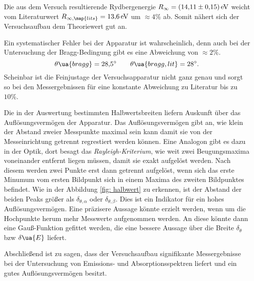 Die aus dem Versuch resultierende Rydbergenergie $R_\infty=\SI{14.11\pm0.15}{\eV}$ weicht vom Literaturwert \cite{anleitung602} %
$R_{\infty,\map{lits}}=\SI{13.6}{\eV}$ um $\approx 4 \%$ ab. Somit nähert sich der
Versuchsaufbau dem Theoriewert gut an.

Ein systematischer Fehler bei der Apparatur ist wahrscheinlich, denn auch bei der %
Untersuchung der Bragg-Bedingung gibt es eine Abweichung von $\approx 2\%$.
\begin{equation*}
  \theta\ua{bragg}=\SI{28.5}{\degree}  \qquad \theta\ua{bragg,lit}=\SI{28}{\degree}.
\end{equation*}
Scheinbar ist die Feinjustage der Versuchsapparatur nicht ganz genau und sorgt so bei den Messergebnissen
für eine konstante Abweichung zu Literatur bis zu $10\%$.

Die in der Auswertung bestimmten Halbwertsbreiten liefern Auskunft über das
Auflösungsvermögen der Apparatur. %
Das Auflösungsvermögen gibt an, wie klein der Abstand zweier Messpunkte maximal sein kann damit sie von der Messeinrichtung
getrennt regrestiert werden können.
Eine Analogon gibt es dazu in der Optik, dort besagt das \emph{Rayleigh-Kriterium},
wie weit zwei Beugungsmaxima voneinander entfernt liegen müssen, damit sie exakt aufgelöst werden.
Nach diesem werden zwei Punkte erst dann getrennt aufgelöst, wenn sich das erste Minumum vom ersten Bildpunkt
sich in einem Maxima des zweiten Bildpunktes befindet.
Wie in der Abbildung \ref{fig: halbwert} zu erkennen, ist der Abstand der beiden Peaks
größer als $\delta_{\theta,\alpha}$ oder $\delta_{\theta,\beta}$. Dies ist ein Indikator
für ein hohes Auflösungsvermögen. Eine präzisere Aussage könnte erzielt werden,
wenn um die Hochpunkte herum mehr Messwerte aufgenommen werden. An diese
könnte dann eine Gauß-Funktion gefittet werden, die eine bessere Aussage über die
Breite $\delta_\theta$ bzw $\delta\ua{E}$ liefert.

Abschließend ist zu sagen, dass der Versuchsaufbau signifikante Messergebnisse
bei der Untersuchung von Emissions- und Absorptionsspektren liefert und ein
gutes Auflösungsvermögen besitzt.
